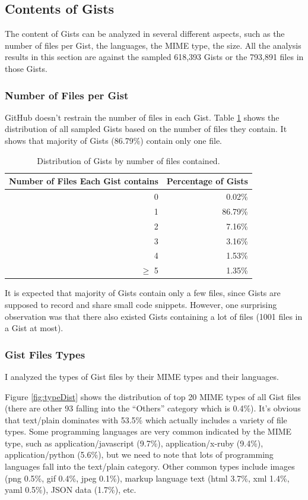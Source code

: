\subsection{Contents of Gists}
The content of Gists can be analyzed in several different aspects, such as the number of files per Gist, the languages, the MIME type, the size. All the analysis results in this section are against the sampled 618,393 Gists or the 793,891 files in those Gists.

\subsubsection{Number of Files per Gist}

GitHub doesn't restrain the number of files in each Gist. Table \ref{tb:files} shows the distribution of all sampled Gists based on the number of files they contain. It shows that majority of Gists (86.79\%) contain only one file. 

\begin{table}[!htb]
 \begin{center}
 \begin{tabular}{@{}rr} 
    \textbf{Number of Files Each Gist contains}	&	\textbf{Percentage of Gists} \\ \hline
	0	&	0.02\%\\
	1	&	86.79\%\\
	2	&	7.16\%\\
	3	&	3.16\%\\
	4	&	1.53\%\\
	$\geq$ 5	&	1.35\%\\\hline
 \end{tabular}
 \end{center}
 \caption{Distribution of Gists by number of files contained.}
 \label{tb:files}
\end{table}

It is expected that majority of Gists contain only a few files, since Gists are supposed to record and share small code snippets. However, one surprising observation was that there also existed Gists containing a lot of files (1001 files in a Gist at most). 

\subsubsection{Gist Files Types}
I analyzed the types of Gist files by their MIME types and their languages.

Figure \ref{fig:typeDist} shows the distribution of top 20 MIME types of all Gist files (there are other 93 falling into the ``Others'' category which is 0.4\%). It's obvious that text/plain dominates with 53.5\% which actually includes a variety of file types. Some programming languages are very common indicated by the MIME type, such as application/javascript (9.7\%), application/x-ruby (9.4\%), application/python (5.6\%), but we need to note that lots of programming languages fall into the text/plain category. Other common types include images (png 0.5\%, gif 0.4\%, jpeg 0.1\%), markup language text (html 3.7\%, xml 1.4\%, yaml 0.5\%), JSON data (1.7\%), etc. 

